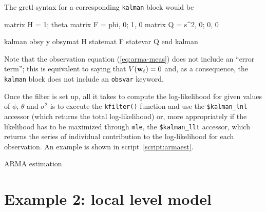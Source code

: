 The gretl syntax for a corresponding \texttt{kalman} block would be
\begin{code}
matrix H = {1; theta}
matrix F = {phi, 0; 1, 0}
matrix Q = {s^2, 0; 0, 0}

kalman
    obsy y
    obsymat H
    statemat F
    statevar Q
end kalman
\end{code}
Note that the observation equation (\ref{eq:arma-meas}) does not
include an ``error term''; this is equivalent to saying that
$V(\mathbf{w}_t) = 0$ and, as a consequence, the \texttt{kalman} block
does not include an \texttt{obsvar} keyword.

Once the filter is set up, all it takes to compute the log-likelihood
for given values of $\phi$, $\theta$ and $\sigma^2$ is to execute the
\texttt{kfilter()} function and use the \verb+$kalman_lnl+ accessor
(which returns the total log-likelihood) or, more appropriately if the
likelihood has to be maximized through \texttt{mle}, the
\verb+$kalman_llt+ accessor, which returns the series of individual
contribution to the log-likelihood for each observation. An example
is shown in script~\ref{script:armaest}.

\begin{script}[htbp]
  \caption{ARMA estimation}
  \label{script:armaest}
\end{script}

\section{Example 2: local level model}
\label{sec:example_loclev}

